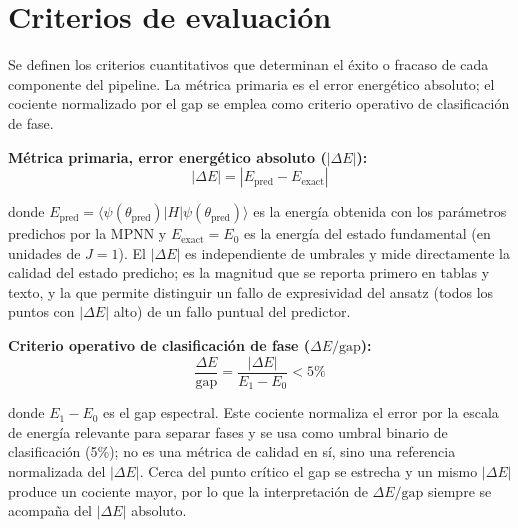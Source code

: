 \documentclass[11pt,a4paper,spanish]{book}
\begin{document}
\section{Criterios de evaluación}
\label{sec:evaluacion}

Se definen los criterios cuantitativos que determinan el éxito o fracaso de cada componente del pipeline. La métrica primaria es el error energético absoluto; el cociente normalizado por el gap se emplea como criterio operativo de clasificación de fase.

\textbf{Métrica primaria, error energético absoluto ($|\Delta E|$):}
\begin{equation}
|\Delta E| = |E_{\text{pred}} - E_{\text{exact}}|
\label{eq:abs_error}
\end{equation}

\noindent donde $E_{\text{pred}} = \langle \psi(\theta_{\text{pred}}) | H | \psi(\theta_{\text{pred}}) \rangle$ es la energía obtenida con los parámetros predichos por la MPNN y $E_{\text{exact}} = E_0$ es la energía del estado fundamental (en unidades de $J = 1$). El $|\Delta E|$ es independiente de umbrales y mide directamente la calidad del estado predicho; es la magnitud que se reporta primero en tablas y texto, y la que permite distinguir un fallo de expresividad del ansatz (todos los puntos con $|\Delta E|$ alto) de un fallo puntual del predictor.

\textbf{Criterio operativo de clasificación de fase ($\Delta E/\text{gap}$):}
\begin{equation}
\frac{\Delta E}{\text{gap}} = \frac{|\Delta E|}{E_1 - E_0} < 5\%
\label{eq:de_gap}
\end{equation}

\noindent donde $E_1 - E_0$ es el gap espectral. Este cociente normaliza el error por la escala de energía relevante para separar fases y se usa como umbral binario de clasificación (5\%); no es una métrica de calidad en sí, sino una referencia normalizada del $|\Delta E|$. Cerca del punto crítico el gap se estrecha y un mismo $|\Delta E|$ produce un cociente mayor, por lo que la interpretación de $\Delta E/\text{gap}$ siempre se acompaña del $|\Delta E|$ absoluto.
\end{document}
